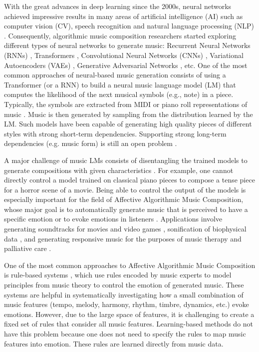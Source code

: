 With the great advances in deep learning since the 2000s, neural networks achieved impressive results in many areas of artificial intelligence (AI) such as computer vision (CV), speech recognition and natural language processing (NLP) \cite{goodfellow2016deep}. Consequently, algorithmic music composition researchers started exploring different types of neural networks to generate music: Recurrent Neural Networks (RNNs) \cite{oore2017learning}, Transformers \cite{huang2018music}, Convolutional Neural Networks (CNNs) \cite{huang2019counterpoint}, Variational Autoencoders (VAEs) \cite{roberts2018hierarchical}, Generative Adversarial Networks \cite{dong2018musegan}, etc. One of the most common approaches of neural-based music generation consists of using a Transformer (or a RNN) to build a neural music language model (LM) that computes the likelihood of the next musical symbols (e.g., note) in a piece. Typically, the symbols are extracted from MIDI or piano roll representations of music \cite{briot2017deep}. Music is then generated by sampling from the distribution learned by the LM. Such models have been capable of generating high quality pieces of different styles with strong short-term dependencies. Supporting strong long-term dependencies (e.g. music form) is still an open problem \cite{briot2017deep}.

A major challenge of music LMs consists of disentangling the trained models to generate compositions with given characteristics \cite{ferreira_2019}. For example, one cannot directly control a model trained on classical piano pieces to compose a tense piece for a horror scene of a movie. Being able to control the output of the models is especially important for the field of Affective Algorithmic Music Composition, whose major goal is to automatically generate music that is perceived to have a specific emotion or to evoke emotions in listeners \cite{williams2015investigating}. Applications involve generating soundtracks for movies and video games \cite{williams2015dynamic}, sonification of biophysical data \cite{Chen2015}, and generating responsive music for the purposes of music therapy and palliative care \cite{miranda2011brain}.

One of the most common approaches to Affective Algorithmic Music Composition is rule-based systems \cite{williams2015investigating}, which use rules encoded by music experts to model principles
from music theory to control the emotion of generated music. These systems are helpful in systematically investigating how a small combination of music features (tempo, melody, harmony, rhythm, timbre, dynamics, etc.) evoke emotions. However, due to the large space of features, it is challenging to create a fixed set of rules that consider all music features. Learning-based methods do not have this problem because one does not need to specify the rules to map music features into emotion. These rules are learned directly from music data.

